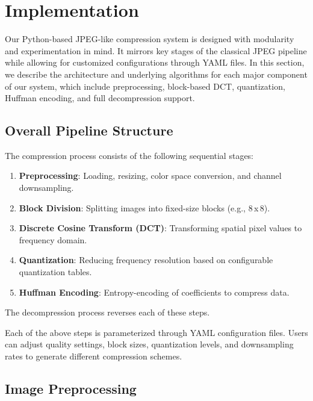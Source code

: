 \section{Implementation}
\label{sec:implementation}

Our Python-based JPEG-like compression system is designed with modularity and experimentation in mind. It mirrors key stages of the classical JPEG pipeline while allowing for customized configurations through YAML files. In this section, we describe the architecture and underlying algorithms for each major component of our system, which include preprocessing, block-based DCT, quantization, Huffman encoding, and full decompression support.

\subsection{Overall Pipeline Structure}

The compression process consists of the following sequential stages:
\begin{enumerate}
    \item \textbf{Preprocessing}: Loading, resizing, color space conversion, and channel downsampling.
    \item \textbf{Block Division}: Splitting images into fixed-size blocks (e.g., 8\,x\,8).
    \item \textbf{Discrete Cosine Transform (DCT)}: Transforming spatial pixel values to frequency domain.
    \item \textbf{Quantization}: Reducing frequency resolution based on configurable quantization tables.
    \item \textbf{Huffman Encoding}: Entropy-encoding of coefficients to compress data.
\end{enumerate}
The decompression process reverses each of these steps.

Each of the above steps is parameterized through YAML configuration files. Users can adjust quality settings, block sizes, quantization levels, and downsampling rates to generate different compression schemes.

\subsection{Image Preprocessing}
\label{sec:preprocessing}

